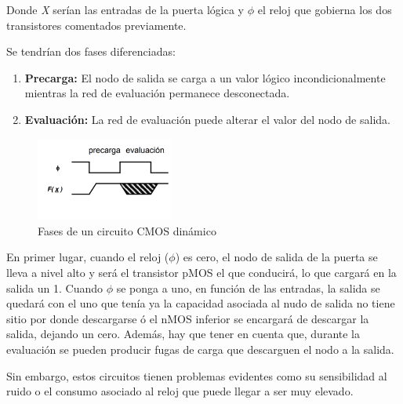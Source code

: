 \newline Donde \textit{X} serían las entradas de la puerta lógica y $\phi$ el reloj que gobierna los dos transistores comentados previamente.
\par Se tendrían dos fases diferenciadas:
\begin{enumerate}
    \item \textbf{Precarga:} El nodo de salida se carga a un valor lógico incondicionalmente mientras la red de evaluación permanece desconectada.
    \item \textbf{Evaluación:} La red de evaluación puede alterar el valor del nodo de salida.
\end{enumerate}
\begin{figure}[h]%
\begin{center}
\includegraphics[width=0.4\textwidth]{figures/DynamicGraph.PNG}
\caption{Fases de un circuito CMOS dinámico}
\label{fig:Ib}
\end{center}
\end{figure}
\par \cite{TheoryExpl} En primer lugar, cuando el reloj ($\phi$) es cero, el nodo de salida de la puerta se lleva a nivel alto y será el transistor pMOS el que conducirá, lo que cargará en la salida un 1. Cuando $\phi$ se ponga a uno, en función de las entradas, la salida se quedará con el uno que tenía ya la capacidad asociada al nudo de salida no tiene sitio por donde descargarse ó el nMOS inferior se encargará de descargar la salida, dejando un cero. Además, hay que tener en cuenta que, durante la evaluación se pueden producir fugas de carga que descarguen el nodo a la salida.

\par Sin embargo, estos circuitos tienen problemas evidentes como su sensibilidad al ruido o el consumo asociado al reloj que puede llegar a ser muy elevado.
